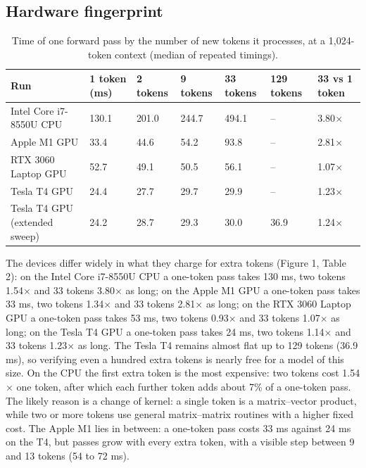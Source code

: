 \documentclass[11pt,a4paper]{article}
\begin{document}
\subsection{Hardware fingerprint}
\begin{table}[tbp]
\centering
\small
\caption{Time of one forward pass by the number of new tokens it processes, at a 1,024-token context (median of repeated timings).}
\setlength{\tabcolsep}{4pt}
\begin{tabular}{L{3.76cm}L{1.83cm}L{1.54cm}L{1.54cm}L{1.64cm}L{1.74cm}L{2.12cm}}
\toprule
\textbf{Run} & \textbf{1 token (ms)} & \textbf{2 tokens} & \textbf{9 tokens} & \textbf{33 tokens} & \textbf{129 tokens} & \textbf{33 vs 1 token} \\
\midrule
Intel Core i7-8550U CPU & 130.1 & 201.0 & 244.7 & 494.1 & -- & 3.80$\times$ \\
Apple M1 GPU & 33.4 & 44.6 & 54.2 & 93.8 & -- & 2.81$\times$ \\
RTX 3060 Laptop GPU & 52.7 & 49.1 & 50.5 & 56.1 & -- & 1.07$\times$ \\
Tesla T4 GPU & 24.4 & 27.7 & 29.7 & 29.9 & -- & 1.23$\times$ \\
Tesla T4 GPU (extended sweep) & 24.2 & 28.7 & 29.3 & 30.0 & 36.9 & 1.24$\times$ \\
\bottomrule
\end{tabular}
\end{table}
The devices differ widely in what they charge for extra tokens (Figure 1, Table 2): on the Intel Core i7-8550U CPU a one-token pass takes 130 ms, two tokens 1.54$\times$ and 33 tokens 3.80$\times$ as long; on the Apple M1 GPU a one-token pass takes 33 ms, two tokens 1.34$\times$ and 33 tokens 2.81$\times$ as long; on the RTX 3060 Laptop GPU a one-token pass takes 53 ms, two tokens 0.93$\times$ and 33 tokens 1.07$\times$ as long; on the Tesla T4 GPU a one-token pass takes 24 ms, two tokens 1.14$\times$ and 33 tokens 1.23$\times$ as long. The Tesla T4 remains almost flat up to 129 tokens (36.9 ms), so verifying even a hundred extra tokens is nearly free for a model of this size. On the CPU the first extra token is the most expensive: two tokens cost 1.54$\times$ one token, after which each further token adds about 7\% of a one-token pass. The likely reason is a change of kernel: a single token is a matrix--vector product, while two or more tokens use general matrix--matrix routines with a higher fixed cost. The Apple M1 lies in between: a one-token pass costs 33 ms against 24 ms on the T4, but passes grow with every extra token, with a visible step between 9 and 13 tokens (54 to 72 ms).
\end{document}
